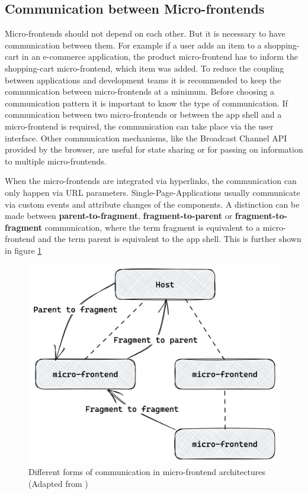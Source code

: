 \subsection{Communication between Micro-frontends}

Micro-frontends should not depend on each other. But it is necessary to have communication between them. For example if a user adds an item to a shopping-cart in an e-commerce application, the product micro-frontend has to inform the shopping-cart micro-frontend, which item was added. To reduce the coupling between applications and development teams it is recommended to keep the communication between micro-frontends at a minimum. Before choosing a communication pattern it is important to know the type of communication. If communication between two micro-frontends or between the app shell and a micro-frontend is required, the communication can take place via the user interface. Other communication mechanisms, like the Broadcast Channel API provided by the browser, are useful for state sharing or for passing on information to multiple micro-frontends. \cite{book:2020:geers:background:micro-frontends:micro-frontends-in-action}

\bigskip

\noindent When the micro-frontends are integrated via hyperlinks, the communication can only happen via URL parameters. Single-Page-Applications usually communicate via custom events and attribute changes of the components. \cite[100]{book:2020:geers:background:micro-frontends:micro-frontends-in-action} \cite[315-316]{book:2019:farrell:background:micro-frontends:web-components-in-action} A distinction can be made between \textbf{parent-to-fragment}, \textbf{fragment-to-parent} or \textbf{fragment-to-fragment} communication, where the term fragment is equivalent to a micro-frontend and the term parent is equivalent to the app shell. \cite{book:2020:geers:background:micro-frontends:micro-frontends-in-action} This is further shown in figure \ref{fig:background:micro-frontend:communication:communication-patterns}

\ifshowImages
\begin{figure}[H]
    \centering
    \includegraphics[width=0.5\linewidth]{images/background/communication/communication-patterns.png}
    \caption{Different forms of communication in micro-frontend architectures (Adapted from \cite[100]{book:2020:geers:background:micro-frontends:micro-frontends-in-action})}\label{fig:background:micro-frontend:communication:communication-patterns}
\end{figure}
\fi

